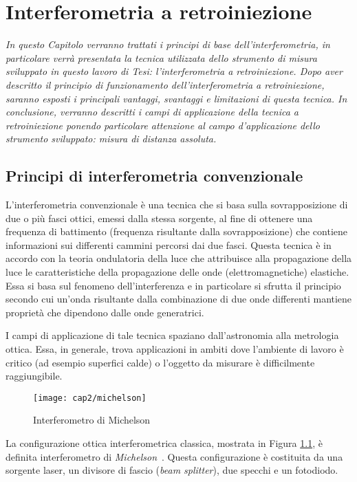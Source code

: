 \chapter{Interferometria a retroiniezione}
\label{capitolo2}
\thispagestyle{empty}

\textit{In questo Capitolo verranno trattati i principi di base dell'interferometria, in particolare verrà presentata la tecnica utilizzata dello strumento di misura sviluppato in questo lavoro di Tesi: l'interferometria a retroiniezione. Dopo aver descritto il principio di funzionamento dell'interferometria a retroiniezione, saranno esposti i principali vantaggi, svantaggi e limitazioni di questa tecnica. In conclusione, verranno descritti i campi di applicazione della tecnica a retroiniezione ponendo particolare attenzione al campo d'applicazione dello strumento sviluppato: misura di distanza assoluta.}

\section{Principi di interferometria convenzionale}
L'interferometria convenzionale è una tecnica che si basa sulla sovrapposizione di due o più fasci ottici, emessi dalla stessa sorgente, al fine di ottenere una frequenza di battimento (frequenza risultante dalla sovrapposizione) che contiene informazioni sui differenti cammini percorsi dai due fasci. Questa tecnica è in accordo con la teoria ondulatoria della luce che attribuisce alla propagazione della luce le caratteristiche della propagazione delle onde (elettromagnetiche) elastiche. Essa si basa sul fenomeno dell'interferenza e in particolare si sfrutta il principio secondo cui un'onda risultante dalla combinazione di due onde differenti mantiene proprietà che dipendono dalle onde generatrici.

I campi di applicazione di tale tecnica spaziano dall'astronomia alla metrologia ottica. Essa, in generale, trova applicazioni in ambiti dove l'ambiente di lavoro è critico (ad esempio superfici calde) o l'oggetto da misurare è difficilmente raggiungibile.
\begin{figure}  
  \begin{center}
    \texttt{[image: cap2/michelson]}
    \caption{Interferometro di Michelson}
    \label{michelson}
  \end{center}
\end{figure}
La configurazione ottica interferometrica classica, mostrata in Figura \ref{michelson}, è definita interferometro di \textit{Michelson}~\cite{sensmeslaser}. Questa configurazione è costituita da una sorgente laser, un divisore di fascio (\textit{beam splitter}), due specchi e un fotodiodo.

